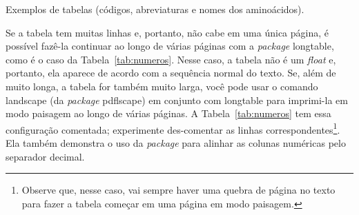 \begin{table}
  \caption{Exemplos de tabelas (códigos, abreviaturas e nomes dos aminoácidos).\label{tab:amino_acidos}}
\end{table}

Se a tabela tem muitas linhas e, portanto, não cabe em uma única página, é
possível fazê-la continuar ao longo de várias páginas com a \textit{package}
\textsf{longtable}, como é o caso da Tabela~\ref{tab:numeros}. Nesse caso,
a tabela não é um \textit{float} e, portanto, ela aparece de acordo com a
sequência normal do texto. Se, além de muito longa, a tabela for também
muito larga, você pode usar o comando \textsf{landscape} (da
\textit{package} \textsf{pdflscape}) em conjunto com \textsf{longtable}
para imprimi-la em modo paisagem ao longo de várias páginas. A
Tabela~\ref{tab:numeros} tem essa configuração comentada; experimente
des-comentar as linhas correspondentes\footnote{Observe que, nesse caso,
vai sempre haver uma quebra de página no texto para fazer a tabela
começar em uma página em modo paisagem.}. Ela também demonstra o uso
da \emph{package}  para alinhar as colunas numéricas pelo
separador decimal.


\bgroup
{}

